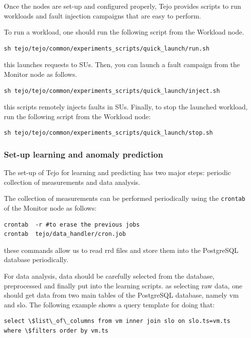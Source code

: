 Once the nodes are set-up and configured properly, Tejo provides scripts to run workloads and fault injection campaigns that are easy to perform.

To run a workload, one should run the following script from the Workload node.

\begin{lstlisting}
sh tejo/tejo/common/experiments_scripts/quick_launch/run.sh
\end{lstlisting}

this launches requests to SUs. Then, you can launch a fault campaign from the Monitor node as follows.

\begin{lstlisting}
sh tejo/tejo/common/experiments_scripts/quick_launch/inject.sh
\end{lstlisting}

this scripts remotely injects faults in SUs. Finally, to stop the launched workload, run the following script from the Workload node:

\begin{lstlisting}
sh tejo/tejo/common/experiments_scripts/quick_launch/stop.sh
\end{lstlisting}

\subsubsection{Set-up learning and anomaly prediction}

The set-up of Tejo for learning and predicting has two major steps: periodic collection of measurements and data analysis.

The collection of measurements can be performed periodically using the \verb|crontab| of the Monitor node as follows:
\begin{lstlisting}
crontab  -r #to erase the previous jobs
crontab  tejo/data_handler/cron.job
\end{lstlisting}

these commands allow us to read rrd files and store them into the PostgreSQL database periodically.

For data analysis, data should be carefully selected from the database, preprocessed and finally put into the learning scripts. as selecting raw data, one should get data from two main tables of the PostgreSQL database, namely vm and slo. The following example shows a query template for doing that:

\begin{lstlisting}
select \$list\_of\_columns from vm inner join slo on slo.ts=vm.ts where \$filters order by vm.ts
\end{lstlisting}

